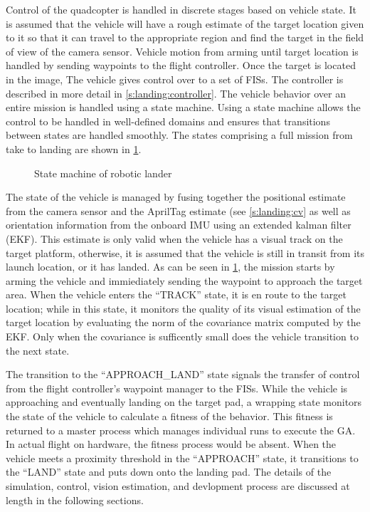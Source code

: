 Control of the quadcopter is handled in discrete stages based on vehicle state. It is assumed that the vehicle
will have a rough estimate of the target location given to it so that it can travel to the appropriate region
and find the target in the field of view of the camera sensor. Vehicle motion from arming until target
location is handled by sending waypoints to the flight controller. Once the target is located in the image,
The vehicle gives control over to a set of FISs. The controller is described in more detail in
\cref{s:landing:controller}. The vehicle behavior over an entire mission is handled using a state
machine\cite{bohren2010smach}. Using a state machine allows the control to be handled in well-defined domains
and ensures that transitions between states are handled smoothly. The states comprising a full mission from
take to landing are shown in \cref{f:smach}.

\begin{figure}[ht]
    \centering
    \caption{State machine of robotic lander}\label{f:smach}
\end{figure}

The state of the vehicle is managed by fusing together the positional estimate from the camera sensor and the
AprilTag estimate (see \cref{s:landing:cv} as well as orientation information from the onboard IMU using an
extended kalman filter (EKF). This estimate is only valid when the vehicle has a visual track on the target
platform, otherwise, it is assumed that the vehicle is still in transit from its launch location, or it has
landed. As can be seen in \cref{f:smach}, the mission starts by arming the vehicle and immiediately sending
the waypoint to approach the target area. When the vehicle enters the ``TRACK'' state, it is en route to the
target location; while in this state, it monitors the quality of its visual estimation of the target location
by evaluating the norm of the covariance matrix computed by the EKF. Only when the covariance is sufficently
small does the vehicle transition to the next state.

The transition to the ``APPROACH\_LAND'' state signals the transfer of control from the flight controller's
waypoint manager to the FISs. While the vehicle is approaching and eventually landing on the target pad, a
wrapping state monitors the state of the vehicle to calculate a fitness of the behavior. This fitness is
returned to a master process which manages individual runs to execute the GA. In actual flight on hardware,
the fitness process would be absent. When the vehicle meets a proximity threshold in the ``APPROACH'' state,
it transitions to the ``LAND'' state and puts down onto the landing pad. The details of the simulation,
control, vision estimation, and devlopment process are discussed at length in the following sections.

